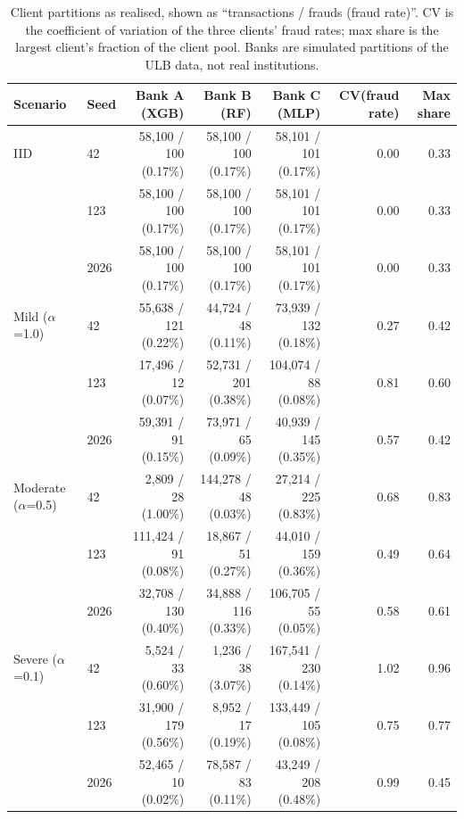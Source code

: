 \begin{table}[t]
\centering
\scriptsize
\caption{Client partitions as realised, shown as ``transactions / frauds (fraud rate)''. CV is the coefficient of variation of the three clients' fraud rates; max share is the largest client's fraction of the client pool. Banks are simulated partitions of the ULB data, not real institutions.}
\label{tab:data}
\begin{tabular}{llrrrrr}
\toprule
Scenario & Seed & Bank A (XGB) & Bank B (RF) & Bank C (MLP) & CV(fraud rate) & Max share \\
\midrule
IID & 42 & 58{,}100 / 100 (0.17\%) & 58{,}100 / 100 (0.17\%) & 58{,}101 / 101 (0.17\%) & 0.00 & 0.33 \\
 & 123 & 58{,}100 / 100 (0.17\%) & 58{,}100 / 100 (0.17\%) & 58{,}101 / 101 (0.17\%) & 0.00 & 0.33 \\
 & 2026 & 58{,}100 / 100 (0.17\%) & 58{,}100 / 100 (0.17\%) & 58{,}101 / 101 (0.17\%) & 0.00 & 0.33 \\
\midrule
Mild ($\alpha$=1.0) & 42 & 55{,}638 / 121 (0.22\%) & 44{,}724 / 48 (0.11\%) & 73{,}939 / 132 (0.18\%) & 0.27 & 0.42 \\
 & 123 & 17{,}496 / 12 (0.07\%) & 52{,}731 / 201 (0.38\%) & 104{,}074 / 88 (0.08\%) & 0.81 & 0.60 \\
 & 2026 & 59{,}391 / 91 (0.15\%) & 73{,}971 / 65 (0.09\%) & 40{,}939 / 145 (0.35\%) & 0.57 & 0.42 \\
\midrule
Moderate ($\alpha$=0.5) & 42 & 2{,}809 / 28 (1.00\%) & 144{,}278 / 48 (0.03\%) & 27{,}214 / 225 (0.83\%) & 0.68 & 0.83 \\
 & 123 & 111{,}424 / 91 (0.08\%) & 18{,}867 / 51 (0.27\%) & 44{,}010 / 159 (0.36\%) & 0.49 & 0.64 \\
 & 2026 & 32{,}708 / 130 (0.40\%) & 34{,}888 / 116 (0.33\%) & 106{,}705 / 55 (0.05\%) & 0.58 & 0.61 \\
\midrule
Severe ($\alpha$=0.1) & 42 & 5{,}524 / 33 (0.60\%) & 1{,}236 / 38 (3.07\%) & 167{,}541 / 230 (0.14\%) & 1.02 & 0.96 \\
 & 123 & 31{,}900 / 179 (0.56\%) & 8{,}952 / 17 (0.19\%) & 133{,}449 / 105 (0.08\%) & 0.75 & 0.77 \\
 & 2026 & 52{,}465 / 10 (0.02\%) & 78{,}587 / 83 (0.11\%) & 43{,}249 / 208 (0.48\%) & 0.99 & 0.45 \\
\bottomrule
\end{tabular}
\end{table}
